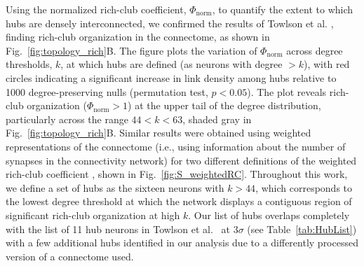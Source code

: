 \documentclass[10pt,letterpaper]{article}
\begin{document}
Using the normalized rich-club coefficient, $\Phi_\mathrm{norm}$, to quantify the extent to which hubs are densely interconnected, we confirmed the results of Towlson et al. \cite{Towlson2013}, finding rich-club organization in the connectome, as shown in Fig.~\ref{fig:topology_rich}B.
The figure plots the variation of $\Phi_\mathrm{norm}$ across degree thresholds, $k$, at which hubs are defined (as neurons with degree $>k$), with red circles indicating a significant increase in link density among hubs relative to 1000 degree-preserving nulls (permutation test, $p < 0.05$).
The plot reveals rich-club organization ($\Phi_\mathrm{norm} > 1$) at the upper tail of the degree distribution, particularly across the range $44 < k < 63$, shaded gray in Fig.~\ref{fig:topology_rich}B.
Similar results were obtained using weighted representations of the connectome (i.e., using information about the number of synapses in the connectivity network) for two different definitions of the weighted rich-club coefficient \cite{Opsahl2008}, shown in Fig.~\ref{fig:S_weightedRC}.
Throughout this work, we define a set of hubs as the sixteen neurons with $k > 44$, which corresponds to the lowest degree threshold at which the network displays a contiguous region of significant rich-club organization at high $k$.
Our list of hubs overlaps completely with the list of 11 hub neurons in Towlson et al.~\cite{Towlson2013} at $3 \sigma$ (see Table~\ref{tab:HubList}) with a few additional hubs identified in our analysis due to a differently processed version of a connectome used.
\end{document}
